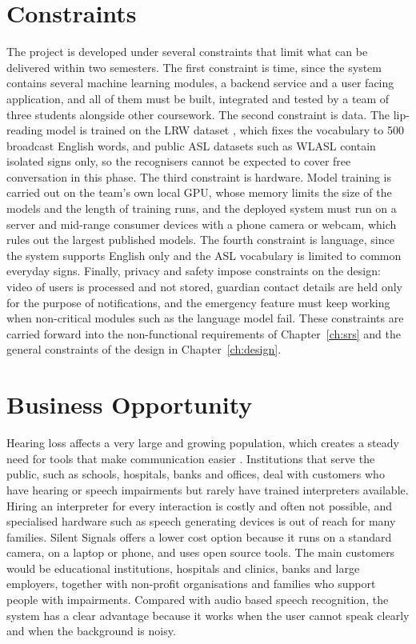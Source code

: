 \documentclass{FastFyp}
\begin{document}
\section{Constraints}
The project is developed under several constraints that limit what can be delivered within two semesters. The first constraint is time, since the system contains several machine learning modules, a backend service and a user facing application, and all of them must be built, integrated and tested by a team of three students alongside other coursework. The second constraint is data. The lip-reading model is trained on the LRW dataset \cite{ref:Chung:2016}, which fixes the vocabulary to 500 broadcast English words, and public ASL datasets such as WLASL \cite{ref:Li:2020} contain isolated signs only, so the recognisers cannot be expected to cover free conversation in this phase. The third constraint is hardware. Model training is carried out on the team's own local GPU, whose memory limits the size of the models and the length of training runs, and the deployed system must run on a server and mid-range consumer devices with a phone camera or webcam, which rules out the largest published models. The fourth constraint is language, since the system supports English only and the ASL vocabulary is limited to common everyday signs. Finally, privacy and safety impose constraints on the design: video of users is processed and not stored, guardian contact details are held only for the purpose of notifications, and the emergency feature must keep working when non-critical modules such as the language model fail. These constraints are carried forward into the non-functional requirements of Chapter~\ref{ch:srs} and the general constraints of the design in Chapter~\ref{ch:design}.

\section{Business Opportunity}
Hearing loss affects a very large and growing population, which creates a steady need for tools that make communication easier \cite{who2021}. Institutions that serve the public, such as schools, hospitals, banks and offices, deal with customers who have hearing or speech impairments but rarely have trained interpreters available. Hiring an interpreter for every interaction is costly and often not possible, and specialised hardware such as speech generating devices is out of reach for many families. Silent Signals offers a lower cost option because it runs on a standard camera, on a laptop or phone, and uses open source tools. The main customers would be educational institutions, hospitals and clinics, banks and large employers, together with non-profit organisations and families who support people with impairments. Compared with audio based speech recognition, the system has a clear advantage because it works when the user cannot speak clearly and when the background is noisy.
\end{document}

